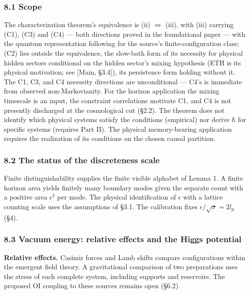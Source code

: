 \documentclass[
]{article}
\begin{document}
\hypertarget{scope}{%
\subsubsection{8.1 Scope}\label{scope}}

The characterization theorem's equivalence is (ii) \(\iff\) (iii), with
(iii) carrying (C1), (C3) and (C4) --- both directions proved in the
foundational paper --- with the quantum representation following for the
source's finite-configuration class; (C2) lies outside the equivalence,
the slow-bath form of its necessity for physical hidden sectors
conditional on the hidden sector's mixing hypothesis (ETH is its
physical motivation; see {[}Main, §3.4{]}), its persistence form holding
without it. The C1, C3, and C4 necessity directions are unconditional
--- C4's is immediate from observed non-Markovianity. For the horizon
application the mixing timescale is an input, the constraint
correlations motivate C1, and C4 is not presently discharged at the
cosmological cut (§2.2). The theorem does not identify which physical
systems satisfy the conditions (empirical) nor derive \(\hbar\) for
specific systems (requires Part II). The physical memory-bearing
application requires the realization of its conditions on the chosen
causal partition.

\hypertarget{the-status-of-the-discreteness-scale}{%
\subsubsection{8.2 The status of the discreteness
scale}\label{the-status-of-the-discreteness-scale}}

Finite distinguishability supplies the finite visible alphabet of Lemma
1. A finite horizon area yields finitely many boundary modes given the
separate count with a positive area \(\epsilon^2\) per mode. The
physical identification of \(\epsilon\) with a lattice counting scale
uses the assumptions of §3.1. The calibration fixes
\(\epsilon/\sqrt{\sigma}=2l_p\) (§4).

\hypertarget{vacuum-energy-relative-effects-and-the-higgs-potential}{%
\subsubsection{8.3 Vacuum energy: relative effects and the Higgs
potential}\label{vacuum-energy-relative-effects-and-the-higgs-potential}}

\textbf{Relative effects.} Casimir forces and Lamb shifts compare
configurations within the emergent field theory. A gravitational
comparison of two preparations uses the stress of each complete system,
including supports and reservoirs. The proposed OI coupling to these
sources remains open (§6.2).
\end{document}

